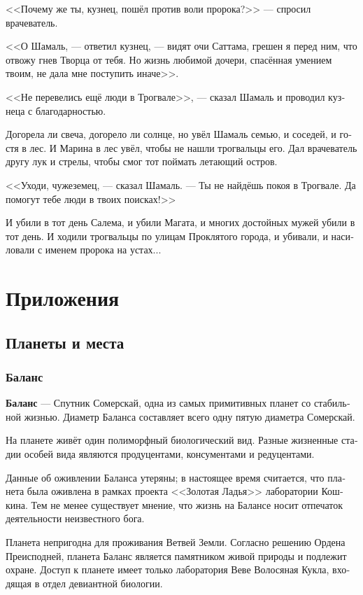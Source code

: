 \documentclass[a4paper,12pt,fleqn]{book}\usepackage{polyglossia}\setdefaultlanguage[babelshorthands=true]{russian}\setotherlanguage{english}\defaultfontfeatures{Ligatures=TeX,Mapping=tex-text}\usepackage{xcolor}\newcommand{\ml}[3]{#2}
\newcommand{\theterm}[3]{\textbf{\hypertarget{#1}{#2}} --- #3}
\begin{document}
<<Почему же ты, кузнец, пошёл против воли пророка?>> --- спросил врачеватель.

<<О Шамаль, --- ответил кузнец, --- видят очи Саттама, грешен я перед ним, что отвожу гнев Творца от тебя.
Но жизнь любимой дочери, спасённая умением твоим, не дала мне поступить иначе>>.

<<Не перевелись ещё люди в Трогвале>>, --- сказал Шамаль и проводил кузнеца с благодарностью.

Догорела ли свеча, догорело ли солнце, но увёл Шамаль семью, и соседей, и гостя в лес.
И Марина в лес увёл, чтобы не нашли трогвальцы его.
Дал врачеватель другу лук и стрелы, чтобы смог тот поймать летающий остров.

<<Уходи, чужеземец, --- сказал Шамаль.
--- Ты не найдёшь покоя в Трогвале.
Да помогут тебе люди в твоих поисках!>>

И убили в тот день Салема, и убили Магата, и многих достойных мужей убили в тот день.
И ходили трогвальцы по улицам Проклятого города, и убивали, и насиловали с именем пророка на устах...

\part*{Приложения}

\appendix

\chapter{Планеты и места}

\section{Баланс}
 
\theterm{balance}
{Баланс}
{Спутник Сомерскай, одна из самых примитивных планет со стабильной жизнью.
Диаметр Баланса составляет всего одну пятую диаметра Сомерскай.

На планете живёт один полиморфный биологический вид.
Разные жизненные стадии особей вида являются продуцентами, консументами и редуцентами.

Данные об оживлении Баланса утеряны;
в настоящее время считается, что планета была оживлена в рамках проекта <<Золотая Ладья>> лаборатории Кошкина.
Тем не менее существует мнение, что жизнь на Балансе носит отпечаток деятельности неизвестного бога.

Планета непригодна для проживания Ветвей Земли.
Согласно решению Ордена Преисподней, планета Баланс является памятником живой природы и подлежит охране.
Доступ к планете имеет только лаборатория Веве Волосяная Кукла, входящая в отдел девиантной биологии.}
\end{document}
